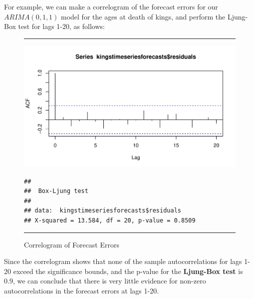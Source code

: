 \documentclass[11pt, letterpaper, twoside]{memoir}\usepackage{knitr}
\begin{document}
For example, we can make a correlogram of the forecast errors for our $ARIMA(0,1,1)$ model for the ages at death of kings, and perform the Ljung-Box test for lags 1-20, as follows:

\begin{figure}
\centering
\rule{4in}{1pt}
\begin{knitrout}
\color{fgcolor}\begin{kframe}
\begin{alltt}
\hlopt{$} \hlstd{=}\hlstd{)}
\end{alltt}
\end{kframe}
\includegraphics[width=\maxwidth]{figure/unnamed-chunk-129-1} 
\begin{kframe}\begin{alltt}
\hlopt{$} \hlstd{=}\hlstd{,} \hlstd{=}\hlstd{)}
\end{alltt}
\begin{verbatim}
## 
## 	Box-Ljung test
## 
## data:  kingstimeseriesforecasts$residuals
## X-squared = 13.584, df = 20, p-value = 0.8509
\end{verbatim}
\end{kframe}
\end{knitrout}
\caption{Correlogram of Forecast Errors}
\label{Fig:correrrforecast}
\rule{4in}{1pt}
\end{figure}

Since the correlogram shows that none of the sample autocorrelations for lags 1-20 exceed the significance bounds, and the p-value for the \textbf{Ljung-Box test} is 0.9, we can conclude that there is very little evidence for non-zero autocorrelations in the forecast errors at lags 1-20.
\end{document}
